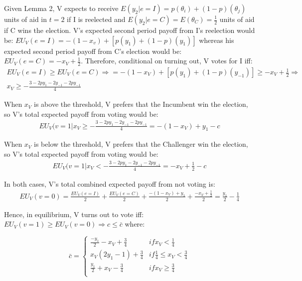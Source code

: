 \documentclass[12pt]{paper}
\begin{document}
Given Lemma 2, V expects to receive $E(y_2 | e=I)=p(\theta_i )+(1-p)(\theta_j)$ units of aid in $t=2$ if I is reelected and $E(y_2 |e=C)=E(\theta_C )=\frac{1}{2}$ units of aid if C wins the election.  V’s expected second period payoff from I’s reelection would be: $EU_V (e=I) = -(1 - x_v ) + [p(y_1 ) + (1 - p)(y_1 )]$ whereas his expected second period payoff from C’s election would be: $EU_V (e=C) = - x_V + \frac{1}{2}$. Therefore, conditional on turning out, V votes for I iff: 
\begin{gather}
EU_V (e=I) \geq EU_V (e=C) \Rightarrow = -(1 - x_V ) + [p(y_1 ) + (1 - p)(y_{-1} )] \geq - x_V + \frac{1}{2} \Rightarrow \\
x_V \geq -\frac{3 - 2py_1 - 2y_{-1} - 2py_{-1}}{4}
\end{gather}


When $x_V$ is above the threshold, V prefers that the Incumbent win the election, so V’s total expected payoff from voting would be:
\begin{gather}
 EU_V (v=1 | x_V \geq -\frac{3 - 2py_1 - 2y_{-1} - 2py_{-1}}{4} = - (1 - x_V ) + y_1 - c
\end{gather}

When $x_V$ is below the threshold, V prefers that the Challenger win the election, so V’s total expected payoff from voting would be:
\begin{gather}
 EU_V (v=1 | x_V < -\frac{3 - 2py_1 - 2y_{-1} - 2py_{-1}}{4} = -x_V + \frac{1}{2} - c
\end{gather}

In both cases, V’s total combined expected payoff from not voting is:
\begin{gather}
EU_V (v=0) = \frac{EU_V (e=I)}{2} + \frac{EU_V (e=C)}{2} + \frac{- (1 - x_V ) + y_1}{2} + \frac{-x_V + \frac{1}{2}}{2} = \frac{y_1}{2} - \frac{1}{4}
\end{gather}

Hence, in equilibrium, V turns out to vote iff: $EU_V (v=1) \geq EU_V (v=0) \Rightarrow c \leq \bar{c}$ where:

\begin{equation}
\bar{c} =
\begin{cases}
\frac{-y_1}{2} - x_V + \frac{3}{4} & if x_V < \frac{1}{4}\\    
x_V (2y_1 - 1) + \frac{3}{4}     & if \frac{1}{4} \leq x_V < \frac{3}{4}  \\
\frac{y_1}{2} + x_V - \frac{3}{4}     & if x_V \geq \frac{3}{4}  \\
\end{cases}
\end{equation}
\end{document}
